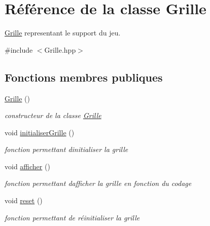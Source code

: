 \hypertarget{class_grille}{}\section{Référence de la classe Grille}
\label{class_grille}


\mbox{\hyperlink{class_grille}{Grille}} representant le support du jeu.  




{\ttfamily \#include $<$Grille.\+hpp$>$}

\subsection*{Fonctions membres publiques}
\begin{DoxyCompactItemize}
\item 
\mbox{\label{class_grille_a8a15d40f4706c34fb2f75d9289f9f615}} 
\mbox{\hyperlink{class_grille_a8a15d40f4706c34fb2f75d9289f9f615}{Grille}} ()
\begin{DoxyCompactList}\small\item\em constructeur de la classe \mbox{\hyperlink{class_grille}{Grille}} \end{DoxyCompactList}\item 
\mbox{\label{class_grille_ab7bdedc97b08bfb40ed00d7e995d7e44}} 
void \mbox{\hyperlink{class_grille_ab7bdedc97b08bfb40ed00d7e995d7e44}{initialiser\+Grille}} ()
\begin{DoxyCompactList}\small\item\em fonction permettant d\textquotesingle{}initialiser la grille \end{DoxyCompactList}\item 
\mbox{\label{class_grille_a22474eed2d2c31ec1cb53e44095eed69}} 
void \mbox{\hyperlink{class_grille_a22474eed2d2c31ec1cb53e44095eed69}{afficher}} ()
\begin{DoxyCompactList}\small\item\em fonction permettant d\textquotesingle{}afficher la grille en fonction du codage \end{DoxyCompactList}\item 
\mbox{\label{class_grille_a17d8b9233b4d7fe24fe5e0c4809674e7}} 
void \mbox{\hyperlink{class_grille_a17d8b9233b4d7fe24fe5e0c4809674e7}{reset}} ()
\begin{DoxyCompactList}\small\item\em fonction permettant de réinitialiser la grille \end{DoxyCompactList}\item 

\end{DoxyCompactItemize}
